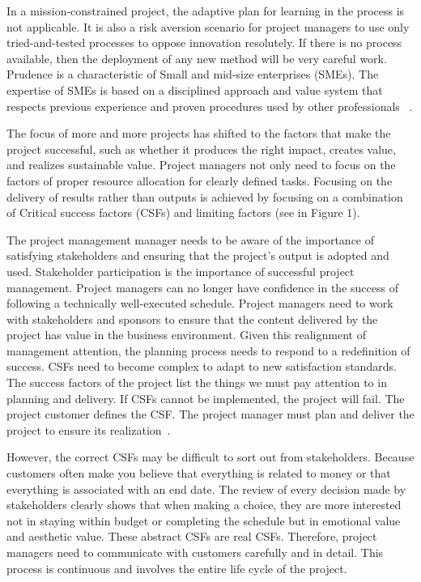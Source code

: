 \documentclass{sigchi}
\begin{document}
In a mission-constrained project, the adaptive plan for learning in the process is not applicable. It is also a risk aversion scenario for project managers to use only tried-and-tested processes to oppose innovation resolutely. If there is no process available, then the deployment of any new method will be very careful work. Prudence is a characteristic of Small and mid-size enterprises (SMEs). The expertise of SMEs is based on a disciplined approach and value system that respects previous experience and proven procedures used by other professionals ~\cite{boehm_software_2001,van_der_waldt_adaptive_2011}.

The focus of more and more projects has shifted to the factors that make the project successful, such as whether it produces the right impact, creates value, and realizes sustainable value. Project managers not only need to focus on the factors of proper resource allocation for clearly defined tasks. Focusing on the delivery of results rather than outputs is achieved by focusing on a combination of Critical success factors (CSFs) and limiting factors (see in Figure 1). 

The project management manager needs to be aware of the importance of satisfying stakeholders and ensuring that the project's output is adopted and used. Stakeholder participation is the importance of successful project management. Project managers can no longer have confidence in the success of following a technically well-executed schedule. Project managers need to work with stakeholders and sponsors to ensure that the content delivered by the project has value in the business environment. Given this realignment of management attention, the planning process needs to respond to a redefinition of success. CSFs need to become complex to adapt to new satisfaction standards. The success factors of the project list the things we must pay attention to in planning and delivery. If CSFs cannot be implemented, the project will fail. The project customer defines the CSF. The project manager must plan and deliver the project to ensure its realization~\cite{boehm_software_2001,van_der_waldt_adaptive_2011,worsley_stakeholder-led_2020}.

However, the correct CSFs may be difficult to sort out from stakeholders. Because customers often make you believe that everything is related to money or that everything is associated with an end date. The review of every decision made by stakeholders clearly shows that when making a choice, they are more interested not in staying within budget or completing the schedule but in emotional value and aesthetic value. These abstract CSFs are real CSFs. Therefore, project managers need to communicate with customers carefully and in detail. This process is continuous and involves the entire life cycle of the project.
\end{document}
